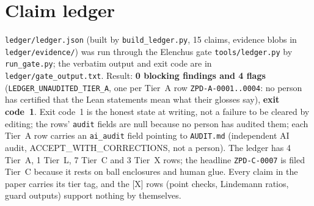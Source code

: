 \documentclass[11pt]{article}
\newcommand{\tier}[1]{\textsf{[#1]}}
\newcommand{\tX}{\tier{X}}
\begin{document}
\section{Claim ledger}\label{sec:ledger}
\texttt{ledger/ledger.json} (built by \texttt{build\_ledger.py}, 15 claims, evidence blobs in \texttt{ledger/evidence/}) was run through the Elenchus gate \texttt{tools/ledger.py} by \texttt{run\_gate.py}; the verbatim output and exit code are in \texttt{ledger/gate\_output.txt}. Result: \textbf{0 blocking findings and 4 flags} (\texttt{LEDGER\_UNAUDITED\_TIER\_A}, one per Tier~A row \texttt{ZPD-A-0001..0004}: no person has certified that the Lean statements mean what their glosses say), \textbf{exit code~1}. Exit code~1 is the honest state at writing, not a failure to be cleared by editing; the rows' \texttt{audit} fields are null because no person has audited them; each Tier~A row carries an \texttt{ai\_audit} field pointing to \texttt{AUDIT.md} (independent AI audit, ACCEPT\_WITH\_CORRECTIONS, not a person). The ledger has 4 Tier~A, 1 Tier~L, 7 Tier~C and 3 Tier~X rows; the headline \texttt{ZPD-C-0007} is filed Tier~C because it rests on ball enclosures and human glue. Every claim in the paper carries its tier tag, and the \tX{} rows (point checks, Lindemann ratios, guard outputs) support nothing by themselves.

\end{document}
